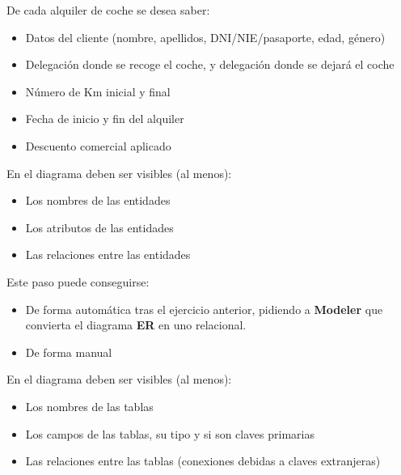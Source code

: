 De cada alquiler de coche se desea saber:
\begin{itemize}
\item Datos del cliente (nombre, apellidos, DNI/NIE/pasaporte, edad,
  género)
\item  Delegación donde se recoge el coche, y delegación donde se
  dejará el coche
\item  Número de Km inicial y final
\item  Fecha de inicio y fin del alquiler
\item  Descuento comercial aplicado
\end{itemize}


\begin{homeworkProblem}
  En el diagrama deben ser visibles (al menos):
  \begin{itemize}
  \item Los nombres de las entidades
  \item Los atributos de las entidades
  \item Las relaciones entre las entidades
  \end{itemize}

\end{homeworkProblem}

\begin{homeworkProblem}
  Este paso puede conseguirse:
  \begin{itemize}
  \item De forma automática tras el ejercicio anterior, pidiendo a \textbf{Modeler} que convierta el diagrama \textbf{ER} en uno relacional.
  \item De forma manual
  \end{itemize}

  En el diagrama deben ser visibles (al menos):
  \begin{itemize}
  \item Los nombres de las tablas
  \item Los campos de las tablas, su tipo y si son claves primarias
  \item Las relaciones entre las tablas (conexiones debidas a claves extranjeras)  
  \end{itemize}
  
\end{homeworkProblem}


